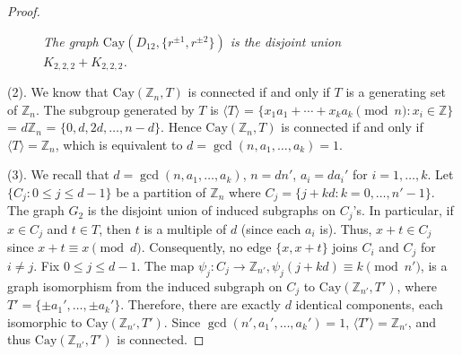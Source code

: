\documentclass[12pt,reqno,a4paper]{amsart}
\theoremstyle{definition}
\begin{document}
\begin{proof}
\begin{figure}[h]
\vspace{-4.5em}
\caption{\em The graph $\mathrm{Cay}(D_{12}, \{r^{\pm1}, r^{\pm2}\})$ is the disjoint union $K_{2,2,2} + K_{2,2,2}$.}
\end{figure}


(2). We know that $\mathrm{Cay}(\mathbb{Z}_n, T)$ is connected if and only if $T$ is a generating set of $\mathbb{Z}_{n}$.  
The subgroup generated by $T$ is 
$\langle T \rangle$ = $\{ x_1 a_1 + \cdots + x_k a_k \pmod{n} : x_i \in \mathbb{Z} \}$
= $d \mathbb{Z}_n$
= $\{ 0, d, 2d, \dots, n - d \}$.  
Hence $\mathrm{Cay}(\mathbb{Z}_n, T)$ is connected if and only if $\langle T \rangle = \mathbb{Z}_n$, which is equivalent to $d=\gcd(n, a_1, \dots, a_k) = 1$.

(3). We recall that $d = \gcd(n, a_1, \dots, a_k)$, $n = d n'$, $a_i = d a_i'$ for $i = 1, \dots, k$.  
Let $\{ C_j : 0 \le j \le d-1 \}$ be a partition of $\mathbb{Z}_{n}$ where 
$C_j = \{j + k d : k = 0, \dots, n'-1\}$.
The graph $G_2$ is the disjoint union of induced subgraphs on $C_j$'s.  
In particular, if $x \in C_j$ and $t \in T$, then $t$ is a multiple of $d$ (since each $a_i$ is).  
Thus, $x + t \in C_j$ since $x + t \equiv x \pmod{d}$.  
Consequently, no edge $\{ x, x + t \}$ joins $C_i$ and $C_j$ for $i \ne j$.
Fix $0 \le j \le d-1$.  
The map 
$\psi_j : C_j \to \mathbb{Z}_{n'}, \psi_j(j + k d) \equiv k \pmod{n'}$,
is a graph isomorphism from the induced subgraph on $C_j$ to 
$\mathrm{Cay}(\mathbb{Z}_{n'}, T')$,  
where $T' = \{\pm a_1', \dots, \pm a_k'\}$.  
Therefore, there are exactly $d$ identical components, each isomorphic to $\mathrm{Cay}(\mathbb{Z}_{n'}, T')$.  
Since $\gcd(n', a_1', \dots, a_k') = 1$, $\langle T' \rangle = \mathbb{Z}_{n'}$, and thus $\mathrm{Cay}(\mathbb{Z}_{n'}, T')$ is connected.  
\end{proof}
\end{document}
